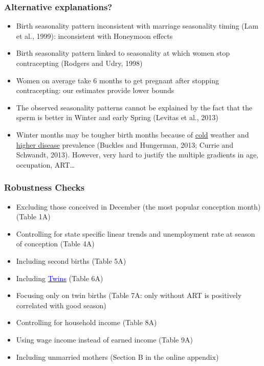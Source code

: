 \documentclass[10pt,letterpaper,subeqn]{beamer}
\begin{document}
\begin{frame}
\frametitle{Alternative explanations?}
\begin{itemize}
\item Birth seasonality pattern inconsistent with marriage seasonality timing (Lam et al., 1999): inconsistent with Honeymoon effects
\item Birth seasonality pattern linked to seasonality at which women stop contracepting (Rodgers and Udry,  1998)
\item Women on average take 6 months to get pregnant after stopping contracepting: our estimates provide lower bounds
\item The observed seasonality patterns cannot be explained by the fact that the sperm is better in Winter and early Spring (Levitas et al., 2013)
\item Winter months may be tougher birth months because of \underline{cold} weather and \underline{higher disease} prevalence (Buckles and Hungerman, 2013; Currie and Schwandt, 2013).  However, very hard to justify the multiple gradients in age, occupation, ART\ldots
\end{itemize}
\end{frame}

\begin{frame}
\hypertarget{robustness}{}
\frametitle{Robustness Checks}
\begin{itemize}
\item Excluding those conceived in December (the most popular conception month) (Table 1A)
\item Controlling for state specific linear trends and unemployment rate at season of conception (Table 4A)
\item Including second births (Table 5A)
\item Including \hyperlink{twins}{\textcolor{blue}{Twins}} (Table 6A)
\item Focusing only on twin births (Table 7A: only without ART is positively correlated with good season)
\item Controlling for household income (Table 8A)
\item Using wage income instead of earned income (Table 9A)
\item Including unmarried mothers (Section B in the online appendix)
\end{itemize}
\end{frame}
\end{document}
